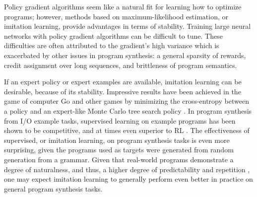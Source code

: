\documentclass{article}
\begin{document}
Policy gradient algorithms seem like a natural fit for learning how to optimize programs; however, methods based on maximum-likelihood estimation, or imitation learning, provide advantages in terms of stability. Training large neural networks with policy gradient algorithms can be difficult to tune. These difficulties are often attributed to the gradient's high variance which is exacerbated by other issues in program synthesis: a general sparsity of rewards, credit assignment over long sequences, and brittleness of program semantics. 


If an expert policy or expert examples are available, imitation learning can be desirable, because of its stability. Impressive results have been achieved in the game of computer Go and other games by minimizing the cross-entropy between a policy and an expert-like Monte Carlo tree search policy \cite{silver2017mastering}. In program synthesis from I/O example tasks, supervised learning on example programs has been shown to be competitive, and at times even superior to RL \cite{bunel2018leveraging}. The effectiveness of supervised, or imitation learning, on program synthesis tasks is even more surprising, given the programs used as targets were generated from random generation from a grammar. Given that real-world programs demonstrate a degree of naturalness, and thus, a higher degree of predictability and repetition \cite{hindle2012naturalness}, one may expect imitation learning to generally perform even better in practice on general program synthesis tasks. 

\end{document}
